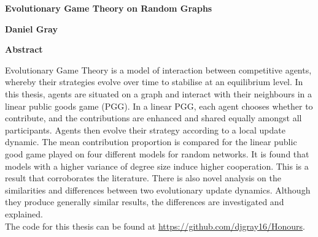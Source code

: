 \thispagestyle{plain}
\begin{center}
    \Large
    \textbf{Evolutionary Game Theory on Random Graphs}
    
    \vspace{0.4cm}
    \large
    
    
    \vspace{0.4cm}
    \textbf{Daniel Gray}
    
    \vspace{0.9cm}
    \textbf{Abstract}
\end{center}
Evolutionary Game Theory is a model of interaction between competitive agents, whereby their strategies evolve over time to stabilise at an equilibrium level. In this thesis, agents are situated on a graph and interact with their neighbours in a linear public goods game (PGG). In a linear PGG,  each agent  chooses whether to contribute, and the contributions are enhanced and shared equally amongst all participants. Agents then evolve their strategy according to a local update dynamic. The mean contribution proportion is compared for the linear public good game played on four different models for random networks. It is found that models with a higher variance of degree size induce higher cooperation. This is a result that corroborates the literature. There is also novel analysis on the similarities and differences between two evolutionary update dynamics. Although they produce generally similar results, the differences are investigated and explained. \\

The code for this thesis can be found at \url{https://github.com/djgray16/Honours}. 